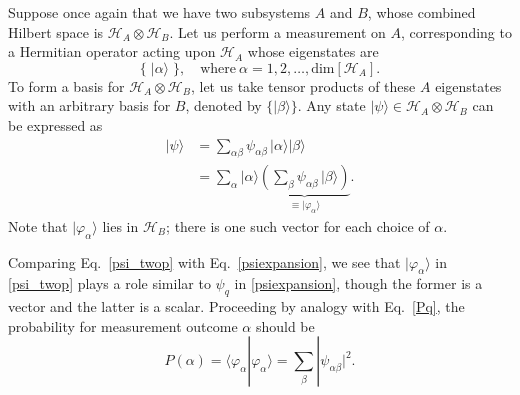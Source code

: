 \documentclass[prx,12pt]{revtex4-2}
\begin{document}
Suppose once again that we have two subsystems $A$ and $B$, whose
combined Hilbert space is $\mathscr{H}_A \otimes \mathscr{H}_B$.  Let
us perform a measurement on $A$, corresponding to a Hermitian operator
acting upon $\mathscr{H}_A$ whose eigenstates are
\begin{equation*}
  \big\{\;|\alpha\rangle\; \big\}, \quad
  \mathrm{where}~\alpha = 1, 2, \dots, \mathrm{dim}\left[\mathscr{H}_A\right].
\end{equation*}
To form a basis for $\mathscr{H}_A \otimes \mathscr{H}_B$, let us take
tensor products of these $A$ eigenstates with an arbitrary basis for
$B$, denoted by $\{|\beta\rangle\}$.  Any state $|\psi\rangle \in
\mathscr{H}_A \otimes \mathscr{H}_B$ can be expressed as
\begin{align}
  |\psi\rangle &= \sum_{\alpha\beta}
  \psi_{\alpha\beta}\, |\alpha\rangle |\beta\rangle \\
  &= \sum_\alpha |\alpha\rangle \underbrace{\left( \sum_\beta \psi_{\alpha\beta}\,|\beta\rangle\right)}_{\displaystyle \equiv |\varphi_\alpha\rangle}.
  \label{psi_twop}
\end{align}
Note that $|\varphi_\alpha\rangle$ lies in $\mathscr{H}_B$; there is
one such vector for each choice of $\alpha$.

Comparing Eq.~\eqref{psi_twop} with Eq.~\eqref{psiexpansion}, we see
that $|\varphi_\alpha\rangle$ in \eqref{psi_twop} plays a role similar
to $\psi_q$ in \eqref{psiexpansion}, though the former is a vector and
the latter is a scalar.  Proceeding by analogy with Eq.~\eqref{Pq},
the probability for measurement outcome $\alpha$ should be
\begin{equation}
  P(\alpha) = \langle\varphi_\alpha|\varphi_\alpha\rangle
  = \sum_\beta |\psi_{\alpha\beta}|^2.
  \label{Palpha0}
\end{equation}
\end{document}
